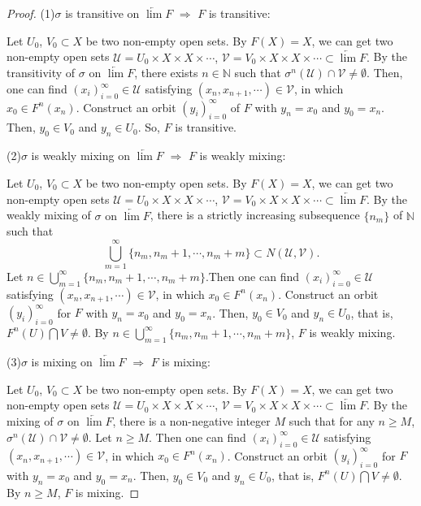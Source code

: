 \documentclass[12pt]{amsart}
\theoremstyle{definition}
\begin{document}
\begin{proof}
	
	{(1)$\sigma$ is transitive on $\underleftarrow{\lim} F$ $\Rightarrow$ $F$ is transitive:}
	
	Let $U_0$, $V_0\subset X$ be two non-empty open sets. {By $F(X)=X$,} we can get two non-empty open sets {$\mathcal{U}=U_0\times X\times X\times\cdots$, $\mathcal{V}=V_0\times X\times X\times\cdots\subset\underleftarrow{\lim} F $.} By the transitivity of {$\sigma$ on $\underleftarrow{\lim} F$}, there exists $n\in\mathbb{N}$ such that $\sigma^n(\mathcal{U})\cap\mathcal{V}\neq\emptyset$. Then, one can find $(x_i)_{i=0}^\infty\in\mathcal{U}$ satisfying $(x_n,x_{n+1},\cdots)\in\mathcal{V}$, in which $x_0\in F^n(x_n)$. Construct an orbit $(y_i)_{i=0}^\infty$ {of} $F$ with $y_n=x_0$ and $y_0=x_n$. Then, $y_0\in V_0$ and $y_n\in U_0$. So, $F$ is transitive.
	
	{(2)$\sigma$ is weakly mixing on $\underleftarrow{\lim} F$ $\Rightarrow$ $F$ is weakly mixing:}
	
	Let $U_0$, $V_0\subset X$ be two non-empty open sets. {By $F(X)=X$,} we can get two non-empty open sets {$\mathcal{U}=U_0\times X\times X\times\cdots$, $\mathcal{V}=V_0\times X\times X\times\cdots\subset\underleftarrow{\lim} F $.} By the weakly mixing of {$\sigma$ on $\underleftarrow{\lim} F$}, there is a strictly increasing subsequence $\{n_m\}$ of $\mathbb{N}$ such that $$\bigcup_{m=1}^\infty\{n_m,n_m+1,\cdots,n_m+m\}\subset N(\mathcal{U},\mathcal{V}).$$ Let $n\in \bigcup_{m=1}^\infty\{n_m,n_m+1,\cdots,n_m+m\}$.Then one can find $(x_i)_{i=0}^\infty\in\mathcal{U}$ satisfying $(x_n,x_{n+1},\cdots)\in\mathcal{V}$, in which $x_0\in F^n(x_n)$. Construct an orbit $(y_i)_{i=0}^\infty$ for $F$ with $y_n=x_0$ and $y_0=x_n$. Then, $y_0\in V_0$ and $y_n\in U_0$, that is, $F^n(U)\bigcap V\neq\emptyset$. By $n\in \bigcup_{m=1}^\infty\{n_m,n_m+1,\cdots,n_m+m\}$, $F$ is weakly mixing.
	
	{(3)$\sigma$ is mixing on $\underleftarrow{\lim} F$ $\Rightarrow$ $F$ is mixing:}
	
	Let $U_0$, $V_0\subset X$ be two non-empty open sets. {By $F(X)=X$,} we can get two non-empty open sets {$\mathcal{U}=U_0\times X\times X\times\cdots$, $\mathcal{V}=V_0\times X\times X\times\cdots\subset\underleftarrow{\lim} F $.} By the mixing of {$\sigma$ on $\underleftarrow{\lim} F$}, there is a non-negative integer $M$ such that for any $n\geq M$, $\sigma^n(\mathcal{U})\cap\mathcal{V}\neq\emptyset$. Let $n\geq M$. Then one can find $(x_i)_{i=0}^\infty\in\mathcal{U}$ satisfying $(x_n,x_{n+1},\cdots)\in\mathcal{V}$, in which $x_0\in F^n(x_n)$. Construct an orbit $(y_i)_{i=0}^\infty$ for $F$ with $y_n=x_0$ and $y_0=x_n$. Then, $y_0\in V_0$ and $y_n\in U_0$, that is, $F^n(U)\bigcap V\neq\emptyset$. By $n\geq M$, $F$ is mixing.
	\end{proof}
\end{document}
